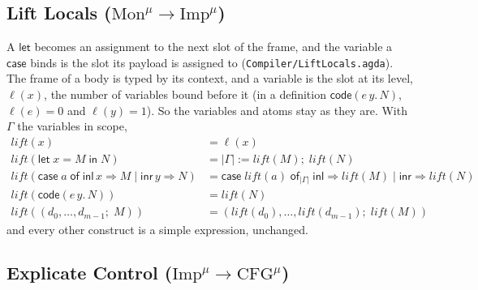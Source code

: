 \documentclass[10pt]{article}
\theoremstyle{acmplain}
\newcommand{\key}[1]{\mathsf{#1}}
\newcommand{\pass}[1]{\mathit{#1}}
\newcommand{\Let}{\key{let}\;}
\newcommand{\In}{\;\key{in}\;}
\newcommand{\Case}[5]{\key{case}\;#1\;\key{of}\;\key{inl}\,#2 \Rightarrow #3 \mid \key{inr}\,#4 \Rightarrow #5}
\newcommand{\assign}[3]{#1 \mathrel{:=} #2;\; #3}
\newcommand{\Casei}[4]{\key{case}\;#1\;\key{of}_{#2}\;\key{inl} \Rightarrow #3 \mid \key{inr} \Rightarrow #4}
\newcommand{\Tcodetm}[3]{\key{code}(#1\,#2.\,#3)}  %
\newcommand{\Ml}[1]{\textrm{#1}^{\mu}}                  %
\begin{document}
\subsection{Lift Locals (\texorpdfstring{$\Ml{Mon} \to \Ml{Imp}$}{Mon-mu -> Imp-mu})}

A $\key{let}$ becomes an assignment to the next slot of the frame, and the
variable a $\key{case}$ binds is the slot its payload is assigned to
(\texttt{Compiler/LiftLocals.agda}). The frame of a body is typed by its
context, and a variable is the slot at its level, $\ell(x)$, the number of
variables bound before it (in a definition $\Tcodetm{e}{y}{N}$,
$\ell(e) = 0$ and $\ell(y) = 1$). So the variables and atoms stay as they
are. With $\Gamma$ the variables in scope,
\begin{align*}
  \pass{lift}(x) &= \ell(x) \\
  \pass{lift}(\Let x = M \In N) &= \assign{|\Gamma|}{\pass{lift}(M)}{\pass{lift}(N)} \\
  \pass{lift}(\Case{a}{x}{M}{y}{N}) &=
    \Casei{\pass{lift}(a)}{|\Gamma|}{\pass{lift}(M)}{\pass{lift}(N)} \\
  \pass{lift}(\Tcodetm{e}{y}{N}) &= \pass{lift}(N) \\
  \pass{lift}((d_0, \ldots, d_{m-1};\; M)) &=
    (\pass{lift}(d_0), \ldots, \pass{lift}(d_{m-1});\; \pass{lift}(M))
\end{align*}
and every other construct is a simple expression, unchanged.

\subsection{Explicate Control (\texorpdfstring{$\Ml{Imp} \to \Ml{CFG}$}{Imp-mu -> CFG-mu})}
\end{document}
